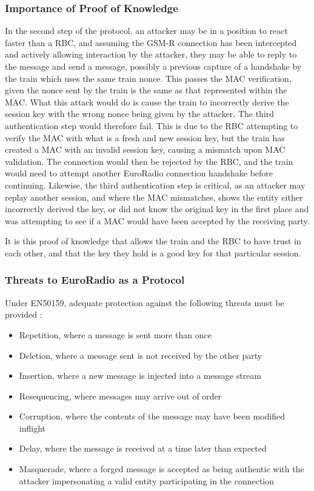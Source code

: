\documentclass[twoside,11pt,a4paper]{article}
\begin{document}
\subsubsection{Importance of Proof of Knowledge}
In the second step of the protocol, an attacker may be in a position to react faster than a RBC, and assuming the GSM-R connection has been intercepted and actively allowing interaction by the attacker, they may be able to reply to the message and send a message, possibly a previous capture of a handshake by the train which uses the same train nonce. This passes the MAC verification, given the nonce sent by the train is the same as that represented within the MAC. What this attack would do is cause the train to incorrectly derive the session key with the wrong nonce being given by the attacker. The third authentication step would therefore fail. This is due to the RBC attempting to verify the MAC with what is a fresh and new session key, but the train has created a MAC with an invalid session key, causing a mismatch upon MAC validation.
The connection would then be rejected by the RBC, and the train would need to attempt another EuroRadio connection handshake before continuing.
Likewise, the third authentication step is critical, as an attacker may replay another session, and where the MAC mismatches, shows the entity either incorrectly derived the key, or did not know the original key in the first place and was attempting to see if a MAC would have been accepted by the receiving party.

It is this proof of knowledge that allows the train and the RBC to have trust in each other, and that the key they hold is a good key for that particular session.


\subsubsection{Threats to EuroRadio as a Protocol}
Under EN50159, adequate protection against the following threats must be provided \citep{EN50159}:
\begin{itemize}[nolistsep]
\item Repetition, where a message is sent more than once
\item Deletion, where a message sent is not received by the other party
\item Insertion, where a new message is injected into a message stream
\item Resequencing, where messages may arrive out of order
\item Corruption, where the contents of the message may have been modified inflight
\item Delay, where the message is received at a time later than expected
\item Masquerade, where a forged message is accepted as being authentic with the attacker impersonating a valid entity participating in the connection
\end{itemize}
\end{document}
